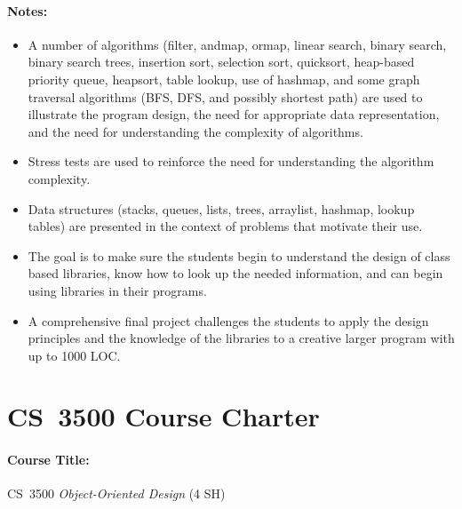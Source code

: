 \documentclass[11pt]{article}
\begin{document}
\paragraph{Notes:}
%
\begin{itemize}

\item A number of algorithms (filter, andmap, ormap, linear search, binary search, binary search trees, insertion sort, selection sort, quicksort, heap-based priority queue, heapsort, table lookup, use of hashmap, and some graph traversal algorithms (BFS, DFS, and possibly shortest path) are used to illustrate the program design, the need for appropriate data representation, and the need for understanding the complexity of algorithms.

\item Stress tests are used to reinforce the need for understanding the algorithm complexity.

\item Data structures (stacks, queues, lists, trees, arraylist, hashmap, lookup tables) are presented in the context of problems that motivate their use.

\item The goal is to make sure the students begin to understand the design of class based libraries, know how to look up the needed information, and can begin using libraries in their programs.

\item A comprehensive final project challenges the students to apply the design principles and the knowledge of the libraries to a creative larger program with up to 1000 LOC.

\end{itemize}


\pagebreak

\section*{CS~3500 Course Charter}

\paragraph{Course Title:}
%
CS~3500 \emph{Object-Oriented Design} (4 SH)
\end{document}
